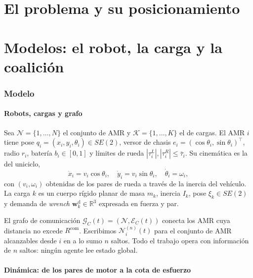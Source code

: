 \documentclass[11pt,a4paper]{article}
\theoremstyle{plain}
\theoremstyle{definition}
\theoremstyle{remark}
\newcommand{\Rb}{\mathbb{R}}
\newcommand{\Ncal}{\mathcal{N}}
\newcommand{\Gcal}{\mathcal{G}}
\newcommand{\Kcal}{\mathcal{K}}
\newcommand{\Wdem}{\bm{w}^{\mathrm{d}}}
\newcommand{\T}{^{\!\top}}
\begin{document}
\part{El problema y su posicionamiento}



\part{Modelos: el robot, la carga y la coalición}

\section{Modelo}
\label{sec:modelo}

\subsection{Robots, cargas y grafo}

Sea $\Ncal=\{1,\dots,N\}$ el conjunto de AMR y $\Kcal=\{1,\dots,K\}$ el de
cargas. El AMR $i$ tiene pose $q_i=(x_i,y_i,\theta_i)\in SE(2)$, versor de
chasis $e_i=(\cos\theta_i,\sin\theta_i)\T$, radio $r_i$, batería
$b_i\in[0,1]$ y límites de rueda $|\tau_{i}^{L}|,|\tau_{i}^{R}|\le\bar\tau_i$.
Su cinemática es la del uniciclo,
\begin{equation}
  \dot x_i=v_i\cos\theta_i,\quad
  \dot y_i=v_i\sin\theta_i,\quad
  \dot\theta_i=\omega_i,
  \label{eq:uniciclo}
\end{equation}
con $(v_i,\omega_i)$ obtenidas de los pares de rueda a través de la inercia del
vehículo. La carga $k$ es un cuerpo rígido planar de masa $m_k$, inercia
$I_k$, pose $\xi_k\in SE(2)$ y demanda de \emph{wrench}
$\Wdem_k\in\Rb^3$ expresada en fuerza y par.

El grafo de comunicación $\Gcal_C(t)=(\Ncal,\mathcal E_C(t))$ conecta los AMR
cuya distancia no excede $R^{\mathrm{com}}$. Escribimos $\Ncal_i^{(n)}(t)$ para
el conjunto de AMR alcanzables desde $i$ en a lo sumo $n$ saltos. Todo el
trabajo opera con información de $n$ saltos: ningún agente lee estado global.


\subsection{Dinámica: de los pares de motor a la cota de esfuerzo}
\label{sec:dinamica}
\end{document}
